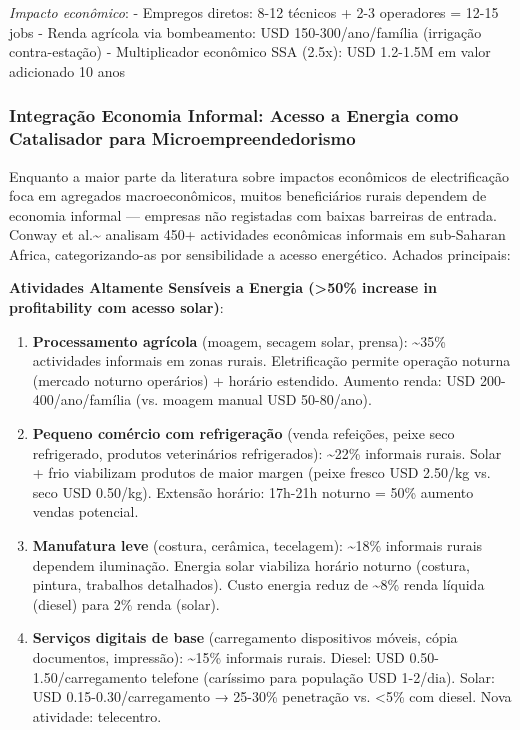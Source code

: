 \documentclass[12pt, a4paper]{article}
\begin{document}
\textit{Impacto econômico}:
- Empregos diretos: 8-12 técnicos + 2-3 operadores = 12-15 jobs
- Renda agrícola via bombeamento: USD 150-300/ano/família (irrigação contra-estação)
- Multiplicador econômico SSA (2.5x): USD 1.2-1.5M em valor adicionado 10 anos

\subsubsection{Integração Economia Informal: Acesso a Energia como Catalisador para Microempreendedorismo}

Enquanto a maior parte da literatura sobre impactos econômicos de electrificação foca em agregados macroeconômicos, muitos beneficiários rurais dependem de economia informal — empresas não registadas com baixas barreiras de entrada. Conway et al.\textasciitilde{}\citep{Conway2019} analisam 450+ actividades econômicas informais em sub-Saharan Africa, categorizando-as por sensibilidade a acesso energético. Achados principais:

\textbf{Atividades Altamente Sensíveis a Energia (>50\% increase in profitability com acesso solar)}:
\begin{enumerate}
\item \textbf{Processamento agrícola} (moagem, secagem solar, prensa): \textasciitilde{}35\% actividades informais em zonas rurais. Eletrificação permite operação noturna (mercado noturno operários) + horário estendido. Aumento renda: USD 200-400/ano/família (vs. moagem manual USD 50-80/ano).
\item \textbf{Pequeno comércio com refrigeração} (venda refeições, peixe seco refrigerado, produtos veterinários refrigerados): \textasciitilde{}22\% informais rurais. Solar + frio viabilizam produtos de maior margen (peixe fresco USD 2.50/kg vs. seco USD 0.50/kg). Extensão horário: 17h-21h noturno = 50\% aumento vendas potencial.
\item \textbf{Manufatura leve} (costura, cerâmica, tecelagem): \textasciitilde{}18\% informais rurais dependem iluminação. Energia solar viabiliza horário noturno (costura, pintura, trabalhos detalhados). Custo energia reduz de \textasciitilde{}8\% renda líquida (diesel) para 2\% renda (solar).
\item \textbf{Serviços digitais de base} (carregamento dispositivos móveis, cópia documentos, impressão): \textasciitilde{}15\% informais rurais. Diesel: USD 0.50-1.50/carregamento telefone (caríssimo para população USD 1-2/dia). Solar: USD 0.15-0.30/carregamento → 25-30\% penetração vs. <5\% com diesel. Nova atividade: telecentro.
\end{enumerate}
\end{document}
